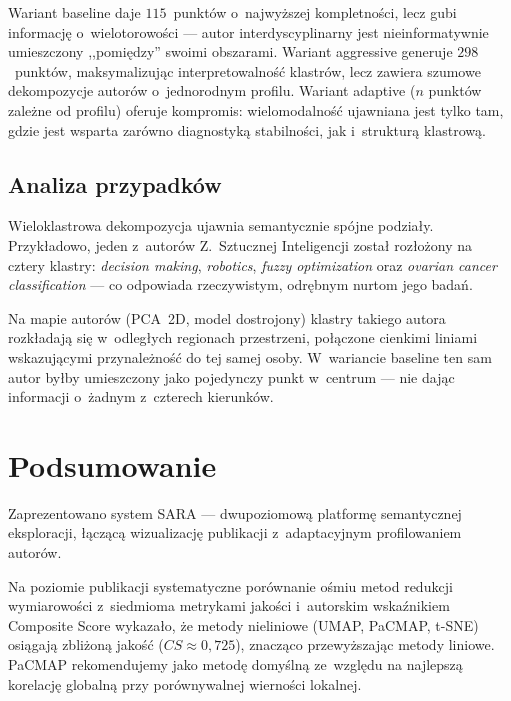 \documentclass[a4paper,11pt,twocolumn]{article}
\begin{document}
Wariant baseline daje $115$~punktów o~najwyższej kompletności, lecz
gubi informację o~wielotorowości --- autor interdyscyplinarny jest
nieinformatywnie umieszczony ,,pomiędzy'' swoimi obszarami. Wariant
aggressive generuje $298$~punktów, maksymalizując interpretowalność
klastrów, lecz zawiera szumowe dekompozycje autorów o~jednorodnym
profilu. Wariant adaptive ($n$ punktów zależne od profilu) oferuje
kompromis: wielomodalność ujawniana jest tylko tam, gdzie jest
wsparta zarówno diagnostyką stabilności, jak i~strukturą klastrową.


\subsection{Analiza przypadków}

Wieloklastrowa dekompozycja ujawnia semantycznie spójne podziały.
Przykładowo, jeden z~autorów Z.~Sztucznej Inteligencji został
rozłożony na cztery klastry: \emph{decision making}, \emph{robotics},
\emph{fuzzy optimization} oraz \emph{ovarian cancer classification}
--- co odpowiada rzeczywistym, odrębnym nurtom jego badań.

Na mapie autorów (PCA~2D, model dostrojony) klastry takiego autora
rozkładają się w~odległych regionach przestrzeni, połączone cienkimi
liniami wskazującymi przynależność do tej samej osoby. W~wariancie
baseline ten sam autor byłby umieszczony jako pojedynczy punkt
w~centrum --- nie dając informacji o~żadnym z~czterech kierunków.


\section{Podsumowanie}
\label{sec:concl}

Zaprezentowano system SARA --- dwupoziomową platformę semantycznej
eksploracji, łączącą wizualizację publikacji z~adaptacyjnym
profilowaniem autorów.

Na poziomie publikacji systematyczne porównanie ośmiu metod redukcji
wymiarowości z~siedmioma metrykami jakości i~autorskim wskaźnikiem
Composite Score wykazało, że metody nieliniowe (UMAP, PaCMAP, t-SNE)
osiągają zbliżoną jakość ($CS \approx 0{,}725$), znacząco przewyższając
metody liniowe. PaCMAP rekomendujemy jako metodę domyślną ze~względu
na najlepszą korelację globalną przy porównywalnej wierności lokalnej.
\end{document}
